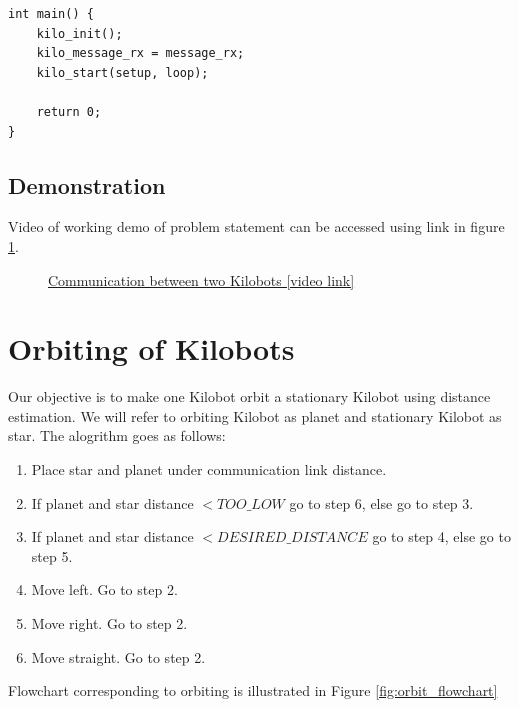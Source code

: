 \begin{verbatim}
int main() {
    kilo_init();
    kilo_message_rx = message_rx;
    kilo_start(setup, loop);

    return 0;
}
\end{verbatim}
\section{Demonstration}
Video of working demo of problem statement can be accessed using link in figure \ref{fig:communication}.
\begin{figure}[H]
	\centering
	\caption{\href{https://photos.app.goo.gl/h2jCY1WrUYU9xLqG8}{Communication between two Kilobots [video link]}}
	\label{fig:communication}
\end{figure}

\chapter{Orbiting of Kilobots}
Our objective is to make one Kilobot orbit a stationary Kilobot using distance estimation. We will refer to orbiting Kilobot as planet and stationary Kilobot as star. The alogrithm goes as follows:

\begin{enumerate}
    \item Place star and planet under communication link distance.
    \item If planet and star distance $<TOO\_LOW$ go to step 6, else go to step 3.
    \item If planet and star distance $<DESIRED\_DISTANCE$ go to step 4, else go to step 5.
    \item Move left. Go to step 2.
    \item Move right. Go to step 2.
    \item Move straight. Go to step 2.
\end{enumerate}
Flowchart corresponding to orbiting is illustrated in Figure \ref{fig:orbit_flowchart}

